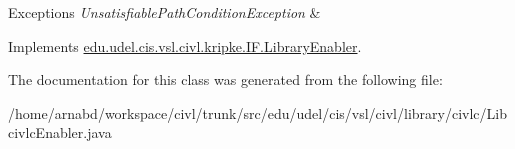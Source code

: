 \begin{DoxyExceptions}{Exceptions}
{\em Unsatisfiable\+Path\+Condition\+Exception} & \\
\hline
\end{DoxyExceptions}


Implements \hyperlink{interfaceedu_1_1udel_1_1cis_1_1vsl_1_1civl_1_1kripke_1_1IF_1_1LibraryEnabler_a7048d9901abda3f7af09cf3827523471}{edu.\+udel.\+cis.\+vsl.\+civl.\+kripke.\+I\+F.\+Library\+Enabler}.



The documentation for this class was generated from the following file\+:\begin{DoxyCompactItemize}
\item 
/home/arnabd/workspace/civl/trunk/src/edu/udel/cis/vsl/civl/library/civlc/Libcivlc\+Enabler.\+java\end{DoxyCompactItemize}
